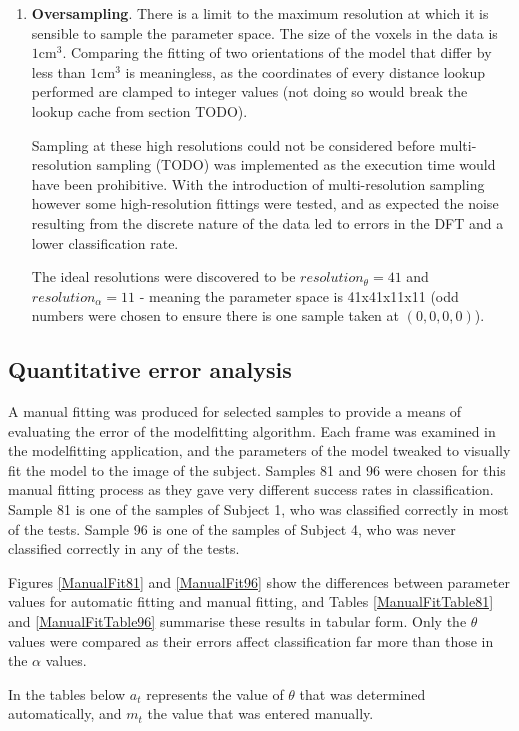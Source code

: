 \begin{enumerate}
	\item \textbf{Oversampling}.
		There is a limit to the maximum resolution at which it is sensible to sample the parameter space.
		The size of the voxels in the data is $1\text{cm}^3$.
		Comparing the fitting of two orientations of the model that differ by less than $1\text{cm}^3$ is meaningless,
		as the coordinates of every distance lookup performed are clamped to integer values (not doing so would break
		the lookup cache from section TODO).
		
		Sampling at these high resolutions could not be considered before multi-resolution sampling (TODO) was implemented
		as the execution time would have been prohibitive.
		With the introduction of multi-resolution sampling however some high-resolution fittings were tested, and as expected
		the noise resulting from the discrete nature of the data led to errors in the DFT and a lower classification rate.
		
		The ideal resolutions were discovered to be $resolution_\theta = 41$ and $resolution_\alpha = 11$ - meaning the
		parameter space is 41x41x11x11 (odd numbers were chosen to ensure there is one sample taken at $(0, 0, 0, 0)$).
\end{enumerate}


\subsection{Quantitative error analysis}

A manual fitting was produced for selected samples to provide a means of evaluating the error of the modelfitting algorithm.
Each frame was examined in the modelfitting application, and the parameters of the model tweaked to visually fit the model to the image of the subject.
Samples 81 and 96 were chosen for this manual fitting process as they gave very different success rates in classification.
Sample 81 is one of the samples of Subject 1, who was classified correctly in most of the tests.
Sample 96 is one of the samples of Subject 4, who was never classified correctly in any of the tests.

Figures \ref{ManualFit81} and \ref{ManualFit96} show the differences between parameter values for automatic fitting and manual fitting,
and Tables \ref{ManualFitTable81} and \ref{ManualFitTable96} summarise these results in tabular form.
Only the $\theta$ values were compared as their errors affect classification far more than those in the $\alpha$ values.

In the tables below $a_t$ represents the value of $\theta$ that was determined automatically, and $m_t$ the value that was entered manually.

